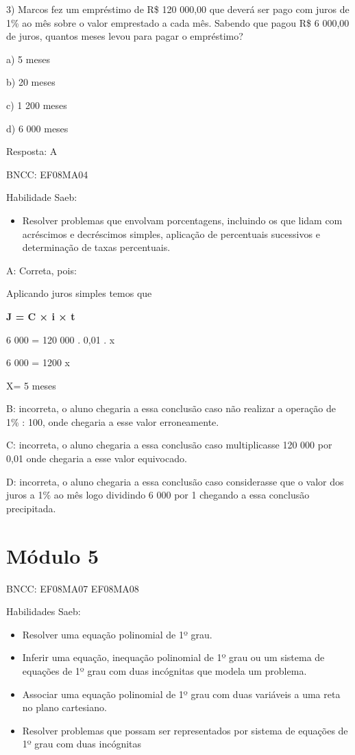 3) Marcos fez um empréstimo de R\$ 120 000,00 que deverá ser pago com
juros de 1\% ao mês sobre o valor emprestado a cada mês. Sabendo que
pagou R\$ 6 000,00 de juros, quantos meses levou para pagar o
empréstimo?

a) 5 meses

b) 20 meses

c) 1 200 meses

d) 6 000 meses

Resposta: A

BNCC: EF08MA04

Habilidade Saeb:

\begin{itemize}
\tightlist
\item
  Resolver problemas que envolvam porcentagens, incluindo os que lidam
  com acréscimos e decréscimos simples, aplicação de percentuais
  sucessivos e determinação de taxas percentuais.
\end{itemize}

A: Correta, pois:

Aplicando juros simples temos que

\textbf{J = C × i × t}

6 000 = 120 000 . 0,01 . x

6 000 = 1200 x

X= 5 meses

B: incorreta, o aluno chegaria a essa conclusão caso não realizar a
operação de 1\% : 100, onde chegaria a esse valor erroneamente.

C: incorreta, o aluno chegaria a essa conclusão caso multiplicasse 120
000 por 0,01 onde chegaria a esse valor equivocado.

D: incorreta, o aluno chegaria a essa conclusão caso considerasse que o
valor dos juros a 1\% ao mês logo dividindo 6 000 por 1 chegando a essa
conclusão precipitada.

\section{Módulo 5}

BNCC: EF08MA07 EF08MA08

Habilidades Saeb:

\begin{itemize}
\item
  Resolver uma equação polinomial de 1º grau.
\item
  Inferir uma equação, inequação polinomial de 1º grau ou um sistema de
  equações de 1º grau com duas incógnitas que modela um problema.
\item
  Associar uma equação polinomial de 1º grau com duas variáveis a uma
  reta no plano cartesiano.
\item
  Resolver problemas que possam ser representados por sistema de
  equações de 1º grau com duas incógnitas
\end{itemize}

